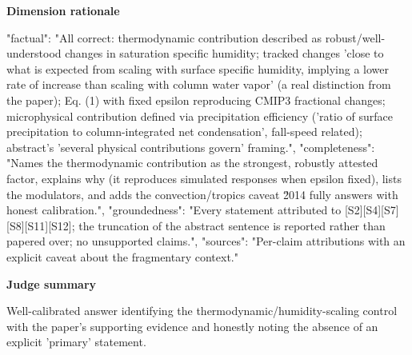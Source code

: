 \documentclass[10pt]{article}
\begin{document}
\textbf{Dimension rationale}
\begin{EvidenceText}
{
  "factual": "All correct: thermodynamic contribution described as robust/well-understood changes in saturation specific humidity; tracked changes 'close to what is expected from scaling with surface specific humidity, implying a lower rate of increase than scaling with column water vapor' (a real distinction from the paper); Eq. (1) with fixed epsilon reproducing CMIP3 fractional changes; microphysical contribution defined via precipitation efficiency ('ratio of surface precipitation to column-integrated net condensation', fall-speed related); abstract's 'several physical contributions govern' framing.",
  "completeness": "Names the thermodynamic contribution as the strongest, robustly attested factor, explains why (it reproduces simulated responses when epsilon fixed), lists the modulators, and adds the convection/tropics caveat \u2014 fully answers with honest calibration.",
  "groundedness": "Every statement attributed to [S2][S4][S7][S8][S11][S12]; the truncation of the abstract sentence is reported rather than papered over; no unsupported claims.",
  "sources": "Per-claim attributions with an explicit caveat about the fragmentary context."
}
\end{EvidenceText}

\textbf{Judge summary}
\begin{EvidenceText}
Well-calibrated answer identifying the thermodynamic/humidity-scaling control with the paper's supporting evidence and honestly noting the absence of an explicit 'primary' statement.
\end{EvidenceText}
\end{document}
